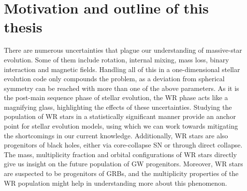 

\section{Motivation and outline of this thesis}\label{sect:motivation_intro}

There are numerous uncertainties that plague our understanding of massive-star evolution. Some of them include rotation, internal mixing, mass loss, binary interaction and magnetic fields. Handling all of this in a one-dimensional stellar evolution code only compounds the problem, as a deviation from spherical symmetry can be reached with more than one of the above parameters. As it is the post-main sequence phase of stellar evolution, the WR phase acts like a magnifying glass, highlighting the effects of these uncertainties. Studying the population of WR stars in a statistically significant manner provide an anchor point for stellar evolution models, using which we can work towards mitigating the shortcomings in our current knowledge. Additionally, WR stars are also progenitors of black holes, either via core-collapse SN or through direct collapse. The mass, multiplicity fraction and orbital configurations of WR stars directly give us insight on the future population of GW progenitors. Moreover, WR stars are suspected to be progenitors of GRBs, and the multiplicity properties of the WR population might help in understanding more about this phenomenon. 

